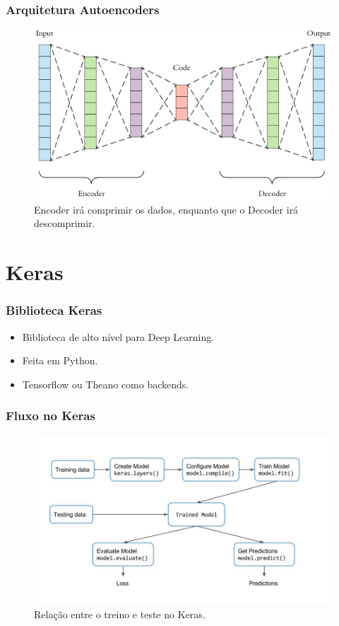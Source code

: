 \documentclass{beamer}
\begin{document}
\begin{frame}
\frametitle{Arquitetura Autoencoders}
\begin{figure}
\includegraphics[width=0.9\linewidth]{images/autoencoder}
\caption{Encoder irá comprimir os dados, enquanto que o Decoder irá descomprimir.}
\end{figure}
\end{frame}

\section{Keras}

\begin{frame}
\frametitle{Biblioteca Keras}
\begin{itemize}
\item Biblioteca de alto nível para Deep Learning.
\item Feita em Python.
\item Tensorflow ou Theano como backends.
\end{itemize}
\end{frame}

\begin{frame}
\frametitle{Fluxo no Keras}
\begin{figure}
\includegraphics[width=0.9\linewidth]{images/keras-flow}
\caption{Relação entre o treino e teste no Keras.}
\end{figure}
\end{frame}
\end{document}
